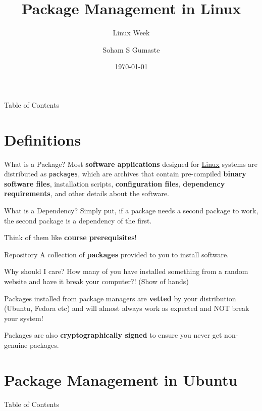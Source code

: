 \documentclass{beamer}
\title{Package Management in Linux}
\subtitle{Linux Week \the\year{}}
\author{Soham S Gumaste}
\date{\today}
\institute{Linux Users Group @ UIC}
\begin{document}
\begin{frame}
	\titlepage
\end{frame}

\begin{frame}{Table of Contents}
	\tableofcontents[pausesections]
\end{frame}

\section{Definitions}
\begin{frame}{What is a Package?}
	Most \textbf{software applications} designed for \underline{Linux}
	systems are distributed as \texttt{packages}, which are archives that
	contain pre-compiled \textbf{binary software files}, installation
	scripts, \textbf{configuration files}, \textbf{dependency
	requirements}, and other details about the software.
\end{frame}

\begin{frame}{What is a Dependency?}
	Simply put, if a package needs a second package to work, the second
	package is a dependency of the first.
	
	\pause

	Think of them like \textbf{course prerequisites}!
\end{frame}

\begin{frame}{Repository}
	A collection of \textbf{packages} provided to you to install software.
\end{frame}

\begin{frame}{Why should I care?}
	How many of you have installed something from a random website and have
	it break your computer?! (Show of hands)

	\pause

	Packages installed from package managers are \textbf{vetted} by your
	distribution (Ubuntu, Fedora etc) and will almost always work as
	expected and NOT break your system!

	\pause

	Packages are also \textbf{cryptographically signed} to ensure you never
	get non-genuine packages.
\end{frame}

\section{Package Management in Ubuntu}
\begin{frame}{Table of Contents}
	\tableofcontents[currentsection]
\end{frame}
\end{document}
